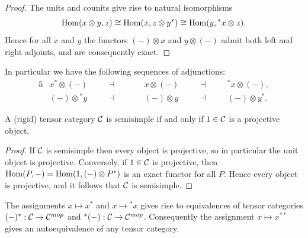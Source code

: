 \documentclass{amsart}
\begin{document}
\begin{proof}
	The units and counits give rise to natural isomorphisms %
 \begin{equation*} 
 	\operatorname{Hom}(x \otimes y, z) \cong \operatorname{Hom}( x, z \otimes y^*) \cong \operatorname{Hom}(y, {}^*x \otimes z).
 \end{equation*}
	Hence for all $x$ and $y$ the functors $(-)\otimes x$ and $y \otimes (-)$ admit both left and right adjoints, and are consequently exact. 
\end{proof}

\noindent In particular we have the following sequences of adjunctions:
\begin{alignat*}{5}
	& x^* \otimes (-)  \quad & &  \dashv \quad &&  \quad x \otimes (-)  \quad &&  \dashv &&  \quad {}^*x \otimes (-), \\
	& (-) \otimes {}^* y  \quad & &  \dashv \quad &&  \quad (-) \otimes y  \quad &&  \dashv &&  \quad (-) \otimes y^*. 
\end{alignat*}

\begin{corollary}
	A (rigid) tensor category $\mathcal C$ is semisimple if and only if $1 \in \mathcal C$ is a projective object. 
\end{corollary}

\begin{proof}
	If $\mathcal C$ is semisimple then every object is projective, so in particular the unit object is projective. Conversely, if $1 \in \mathcal C$ is projective, then $\operatorname{Hom}(P, -) = \operatorname{Hom}( 1, (-) \otimes P^*)$ is an exact functor for all $P$. Hence every object is projective, and it follows that $\mathcal C$ is semisimple.  
\end{proof}

\begin{lemma}
	The assignments $x \mapsto x^*$ and $x \mapsto {}^*x$ gives rise to equivalences of tensor categories $(-)^*: \mathcal C \to \mathcal C^{mop}$ and ${}^*(-): \mathcal C \to \mathcal C^{mop}$. Consequently the assignment $x \mapsto x^{**}$ gives an autoequivalence of any tensor category. 
\end{lemma}

\end{document}
